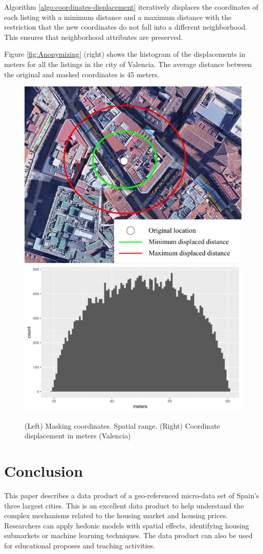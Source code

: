 \documentclass[Royal,times,sageh]{sagej}
\begin{document}
Algorithm \ref{algo:coordinates-displacement} iteratively displaces the
coordinates of each listing with a minimum distance and a maximum
distance with the restriction that the new coordinates do not fall into
a different neighborhood. This ensures that neighborhood attributes are
preserved.

Figure \ref{fig:Anonymizing} (right) shows the histogram of the
displacements in meters for all the listings in the city of Valencia.
The average distance between the original and masked coordinates is 45
meters.

\begin{figure}

{\centering \includegraphics[width=0.29\linewidth,height=0.2\textheight]{EPB_files/points-moved-image} \includegraphics[width=0.37\linewidth,height=0.2\textheight]{EPB_files/coordinates-valencia} 

}

\caption{\label{fig:Anonymizing}(Left) Masking coordinates. Spatial range. (Right) Coordinate displacement in meters (Valencia)}\label{fig:unnamed-chunk-2}
\end{figure}

\hypertarget{conclusion}{%
\section{Conclusion}\label{conclusion}}

This paper describes a data product of a geo-referenced micro-data set
of Spain's three largest cities. This is an excellent data product to
help understand the complex mechanisms related to the housing market and
housing prices. Researchers can apply hedonic models with spatial
effects, identifying housing submarkets or machine learning techniques.
The data product can also be used for educational proposes and teaching
activities.
\end{document}

